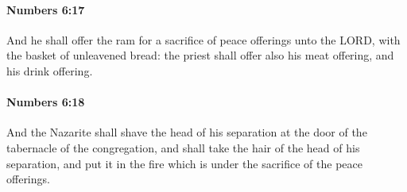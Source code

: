 		\paragraph{Numbers 6:17} %
			\label{NUMBERS-6-17}

			And he shall offer the ram for a sacrifice of peace offerings unto the LORD, with the basket of unleavened bread: the priest shall offer also his meat offering, and his drink offering.


		\paragraph{Numbers 6:18} %
			\label{NUMBERS-6-18}

			And the Nazarite shall shave the head of his separation at the door of the tabernacle of the congregation, and shall take the hair of the head of his separation, and put it in the fire which is under the sacrifice of the peace offerings.

